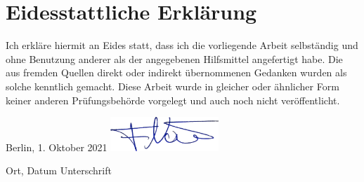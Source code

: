 \thispagestyle{empty}
\section*{Eidesstattliche Erklärung}

Ich erkläre hiermit an Eides statt, dass ich die vorliegende Arbeit selbständig und ohne Benutzung anderer als der angegebenen Hilfsmittel angefertigt habe. Die aus fremden Quellen direkt oder indirekt übernommenen Gedanken wurden als solche kenntlich gemacht. Diese Arbeit wurde in gleicher oder ähnlicher Form keiner anderen Prüfungsbehörde vorgelegt und auch noch nicht veröffentlicht.


\vspace{3cm}

\hspace{0.4cm} Berlin, 1. Oktober 2021 \hfill  \includegraphics[width=115pt]{../images/signature/signature.png} \hspace{1.6cm}



\hspace{1.5cm} Ort, Datum \hfill Unterschrift \hspace{2.1cm}
